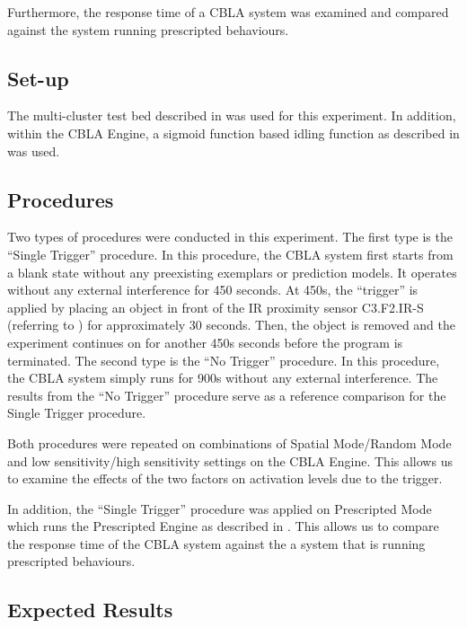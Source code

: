 Furthermore, the response time of a CBLA system was examined and compared against the system running prescripted behaviours.


\subsection{Set-up}\label{sec:multi-cluster-setup}

The multi-cluster test bed described in  was used for this experiment. In addition, within the CBLA Engine, a sigmoid function based idling function as described in  was used.


\subsection{Procedures}

Two types of procedures were conducted in this experiment. 
The first type is the ``Single Trigger'' procedure. In this procedure, the CBLA system first starts from a blank state without any preexisting exemplars or prediction models. It operates without any external interference for 450 seconds. At 450s, the ``trigger'' is applied by placing an object in front of the IR proximity sensor C3.F2.IR-S (referring to ) for approximately 30 seconds. Then, the object is removed and the experiment continues on for another 450s seconds before the program is terminated. 
The second type is the ``No Trigger'' procedure. In this procedure, the CBLA system simply runs for 900s without any external interference. The results from the ``No Trigger'' procedure serve as a reference comparison for the Single Trigger procedure.

Both procedures were repeated on combinations of Spatial Mode/Random Mode and low sensitivity/high sensitivity settings on the CBLA Engine. This allows us to examine the effects of the two factors on activation levels due to the trigger. 

In addition, the ``Single Trigger'' procedure was applied on Prescripted Mode which runs the Prescripted Engine as described in . This allows us to compare the response time of the CBLA system against the a system that is running prescripted behaviours.

\subsection{Expected Results}

